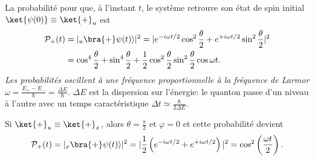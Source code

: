 La probabilité pour que, à l'instant $t$, le système retrouve son état de spin
initial $\ket{\psi(0)}\equiv\ket{+}_{u}$ est
\begin{equation}
\begin{split}
\mathcal{P}_{+}(t)&  =|_{u}\bra{+}\psi(t)\rangle|^{2}=|e^{-i\omega
t/2}\cos^{2}\frac{\theta}{2}+e^{+i\omega t/2}\sin^{2}\frac{\theta}{2}|^{2}\\
&  =\cos^{4}\frac{\theta}{2}+\sin^{4}\frac{\theta}{2}+\frac{1}{2}\cos^{2}%
\frac{\theta}{2}\sin^{2}\frac{\theta}{2}\cos\omega t.
\end{split}
\end{equation}
\emph{Les probabilités oscillent à une fréquence proportionnelle à la
fréquence de Larmor} $\omega=\frac{E_{+}-E_{-}}{\hbar}=\frac{\Delta E}{\hbar}$.
$\Delta E$ est la dispersion sur l'énergie: le quanton passe d'un niveau à
l'autre avec un temps caractéristique $\Delta t\simeq\frac{\hbar}{2\Delta E}$.

Si $\ket{+}_{u}\equiv\ket{+}_{x}$, alors $\theta=\frac{\pi}{2}$ et $\varphi=0$
et cette probabilité devient%
\begin{equation}
\mathcal{P}_{+}(t)=|_{x}\bra{+} \psi(t)\rangle|^{2}
=|\frac{1}{2}\left(e^{-i\omega t/2}+e^{+i\omega t/2}\right)|^{2}
=\cos^{2}\left( \frac{\omega t}{2}\right).
\end{equation}


